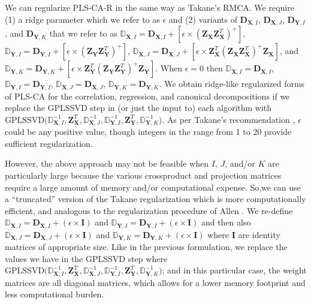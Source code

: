 \documentclass[12pt]{article}
\begin{document}
We can regularize PLS-CA-R in the same way as Takane's RMCA. We require
(1) a ridge parameter which we refer to as \(\epsilon\) and (2) variants
of \({\mathbf D}_{{\mathbf X},I}\), \({\mathbf D}_{{\mathbf X},J}\),
\({\mathbf D}_{{\mathbf Y},I}\), and \({\mathbf D}_{{\mathbf Y},K}\)
that we refer to as
\({\mathbb D}_{{\mathbf X},I} = {\mathbf D}_{{\mathbf X},I} + [\epsilon \times ({\mathbf Z}_{\mathbf X}{\mathbf Z}_{\mathbf X}^{T})^{+}]\),
\({\mathbb D}_{{\mathbf Y},I} = {\mathbf D}_{{\mathbf Y},I} + [\epsilon \times ({\mathbf Z}_{\mathbf Y}{\mathbf Z}_{\mathbf Y}^{T})^{+}]\),
\({\mathbb D}_{{\mathbf X},J} = {\mathbf D}_{{\mathbf X},J} + [\epsilon \times {\mathbf Z}_{\mathbf X}^{T}({\mathbf Z}_{\mathbf X}{\mathbf Z}_{\mathbf X}^{T})^{+}{\mathbf Z}_{\mathbf X}]\),
and
\({\mathbb D}_{{\mathbf Y},K} = {\mathbf D}_{{\mathbf Y},K} + [\epsilon \times {\mathbf Z}_{\mathbf Y}^{T}({\mathbf Z}_{\mathbf Y}{\mathbf Z}_{\mathbf Y}^{T})^{+}{\mathbf Z}_{\mathbf Y}]\).
When \(\epsilon = 0\) then
\({\mathbb D}_{{\mathbf X},I} = {\mathbf D}_{{\mathbf X},I}\),
\({\mathbb D}_{{\mathbf Y},I} = {\mathbf D}_{{\mathbf Y},I}\),
\({\mathbb D}_{{\mathbf X},J} = {\mathbf D}_{{\mathbf X},J}\),
\({\mathbb D}_{{\mathbf Y},K} = {\mathbf D}_{{\mathbf Y},K}\). We obtain
ridge-like regularized forms of PLS-CA for the correlation, regression,
and canonical decompositions if we replace the GPLSSVD step in (or just
the input to) each algorithm with
\(\mathrm{GPLSSVD(}{\mathbb D}_{{\mathbf X},I}^{-1},{\mathbf Z}_{\mathbf X}^{T}, {\mathbb D}_{{\mathbf X},J}^{-1}, {\mathbb D}_{{\mathbf Y},I}^{-1},{\mathbf Z}_{\mathbf Y}^{T}, {\mathbb D}_{{\mathbf Y},K}^{-1} \mathrm{)}\).
As per Takane's recommendation \citep{takane_regularized_2006},
\(\epsilon\) could be any positive value, though integers in the range
from 1 to 20 provide sufficient regularization.

However, the above approach may not be feasible when \(I\), \(J\),
and/or \(K\) are particularly large because the various crossproduct and
projection matrices require a large amount of memory and/or
computational expense. So,we can use a ``truncated'' version of the
Takane regularization which is more computationally efficient, and
analogous to the regularization procedure of Allen
\citep{allen_sparse_2013, allen_generalized_2014}. We re-define
\({\mathbb D}_{{\mathbf X},I} = {\mathbf D}_{{\mathbf X},I} + (\epsilon \times {\mathbf I})\)
and
\({\mathbb D}_{{\mathbf Y},I} = {\mathbf D}_{{\mathbf Y},I} + (\epsilon \times {\mathbf I})\)
and then also
\({\mathbb D}_{{\mathbf X},J} = {\mathbf D}_{{\mathbf X},J} + (\epsilon \times {\mathbf I})\)
and
\({\mathbb D}_{{\mathbf Y},K} = {\mathbf D}_{{\mathbf Y},K} + (\epsilon \times {\mathbf I})\)
where \({\mathbf I}\) are identity matrices of appropriate size. Like in
the previous formulation, we replace the values we have in the GPLSSVD
step where
\(\mathrm{GPLSSVD(}{\mathbb D}_{{\mathbf X},I}^{-1},{\mathbf Z}_{\mathbf X}^{T}, {\mathbb D}_{{\mathbf X},J}^{-1}, {\mathbb D}_{{\mathbf Y},I}^{-1},{\mathbf Z}_{\mathbf Y}^{T}, {\mathbb D}_{{\mathbf Y},K}^{-1} \mathrm{)}\);
and in this particular case, the weight matrices are all diagonal
matrices, which allows for a lower memory footprint and less
computational burden.
\end{document}
